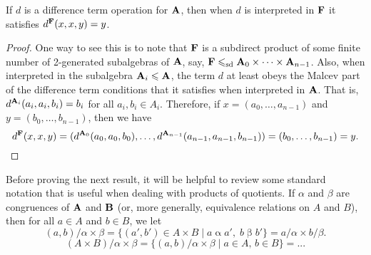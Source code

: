 \begin{lemma}
  If $d$ is a difference term operation for $\mathbf{A}$,
  then when $d$ is interpreted in $\mathbf{F}$ it satisfies $d^{\mathbf{F}}(x,x,y) = y$.
\end{lemma}
\begin{proof}
One way to see this is to note that $\mathbf{F}$ is a
  subdirect product of some finite number of 2-generated subalgebras of $\mathbf{A}$,
  say, $\mathbf{F} \leqslant_{\mathrm{sd}} \mathbf{A}_0 \times \cdots \times \mathbf{A}_{n-1}$. Also, when interpreted
  in the subalgebra $\mathbf{A}_i \leqslant \mathbf{A}$, the term $d$ at least obeys
  the Malcev part of the difference term conditions that it satisfies when
  interpreted in $\mathbf{A}$.
  That is,   $d^{\mathbf{A}_i}(a_i, a_i, b_i) = b_i$ for all $a_i, b_i \in A_i$.
  Therefore, if $x = (a_0, \dots, a_{n-1})$
  and $y = (b_0, \dots, b_{n-1})$, then we have
  \[d^{\mathbf{F}}(x,x,y) = 
  (d^{\mathbf{A}_0}(a_0, a_0, b_0), \dots,d^{\mathbf{A}_{n-1}}(a_{n-1}, a_{n-1}, b_{n-1}))
  = (b_0, \dots, b_{n-1}) = y.\]
\end{proof}


Before proving the next result, it will be helpful to review some standard
notation that is useful when dealing with products of quotients.  If $\alpha$
and $\beta$ are congruences of $\mathbf{A}$ and 
$\mathbf{B}$ (or, more generally, equivalence relations on $A$ and $B$), then
for all $a\in A$ and $b\in B$, we let
\[
(a,b)/\alpha \times \beta = \{(a', b') \in A\times B \mid a\mathrel{\alpha} a', \;
b\mathrel{\beta} b'\} = a/\alpha \times b/\beta.
\]
\[
(A\times B)/\alpha \times \beta = \{(a, b)/\alpha \times \beta \mid a\in A,\, b \in B\}
 = ...
\]

\newpage

